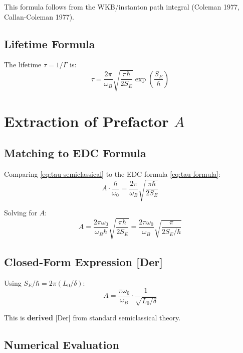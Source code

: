 \documentclass[11pt]{article}
\newcommand{\tagDer}{{\small\textsf{[Der]}}}
\begin{document}
This formula follows from the WKB/instanton path integral (Coleman 1977, Callan-Coleman 1977).

\subsection{Lifetime Formula}

The lifetime $\tau = 1/\Gamma$ is:
\begin{equation}
    \tau = \frac{2\pi}{\omega_B} \sqrt{\frac{\pi\hbar}{2S_E}} \exp\left(\frac{S_E}{\hbar}\right)
    \label{eq:tau-semiclassical}
\end{equation}

\section{Extraction of Prefactor $A$}

\subsection{Matching to EDC Formula}

Comparing \eqref{eq:tau-semiclassical} to the EDC formula \eqref{eq:tau-formula}:
\begin{equation}
    A \cdot \frac{\hbar}{\omega_0} = \frac{2\pi}{\omega_B} \sqrt{\frac{\pi\hbar}{2S_E}}
\end{equation}

Solving for $A$:
\begin{equation}
    A = \frac{2\pi\omega_0}{\omega_B \hbar} \sqrt{\frac{\pi\hbar}{2S_E}} = \frac{2\pi\omega_0}{\omega_B} \sqrt{\frac{\pi}{2S_E/\hbar}}
\end{equation}

\subsection{Closed-Form Expression \tagDer{}}

Using $S_E/\hbar = 2\pi(L_0/\delta)$:
\begin{equation}
    \boxed{A = \frac{\pi \omega_0}{\omega_B} \cdot \frac{1}{\sqrt{L_0/\delta}}}
    \label{eq:A-derived}
\end{equation}

This is \textbf{derived} \tagDer{} from standard semiclassical theory.

\subsection{Numerical Evaluation}
\end{document}
